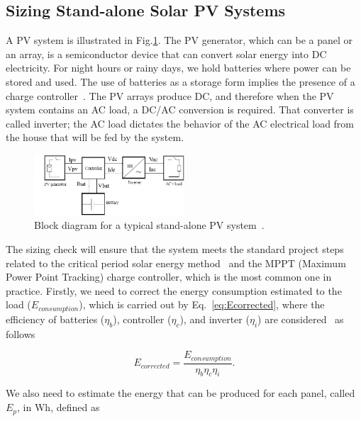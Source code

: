 \documentclass[runningheads]{llncs}
\begin{document}
\subsection{Sizing Stand-alone Solar PV Systems}
\label{sec:sizing}

A PV system is illustrated in Fig.\ref{fig:blockdiagram}. 
The PV generator, which can be a panel or an array, is a semiconductor device that can convert solar energy into DC electricity. 
For night hours or rainy days, we hold batteries where power can be stored and used. The use of batteries as a storage form implies the presence of a charge controller~\cite{Hansen}. The PV arrays produce DC, and therefore when the PV system contains an AC load, a DC/AC conversion is required. That converter is called inverter; the AC load dictates the behavior of the AC electrical load from the house that will be fed by the system.

\begin{figure}
\includegraphics[width=0.5\textwidth]{blockdiagramPVS2_rev}
\centering
\caption{Block diagram for a typical stand-alone PV system~\cite{Hansen}.}
\label{fig:blockdiagram} 
\end{figure}

The sizing check will ensure that the system meets the standard project steps related to the critical period solar energy method~\cite{Pinho} and the MPPT (Maximum Power Point Tracking) charge controller, which is the most common one in practice. Firstly, we need to correct the energy consumption estimated to the load ($E_{consumption}$), which is carried out by Eq.~\ref{eq:Ecorrected}, where the efficiency of batteries ($\eta_{b}$), controller ($\eta_{c}$), and inverter ($\eta_{i}$) are considered~\cite{Pinho} as follows

\begin{equation}
\label{eq:Ecorrected}
E_{corrected} = \frac {E_{consumption}}{\eta_{b} \eta_{c} \eta_{i} }.
\end{equation}

We also need to estimate the energy that can be produced for each panel, called $E_{p}$, in Wh, defined as
\end{document}
